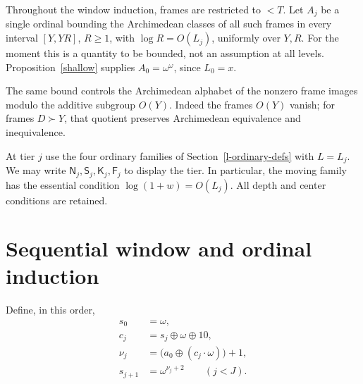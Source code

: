 \documentclass[11pt]{article}
\theoremstyle{definition}
\theoremstyle{remark}
\newcommand{\hs}{\mathbin{\oplus}}
\newcommand{\NN}{\mathsf N}
\newcommand{\SSS}{\mathsf S}
\newcommand{\KK}{\mathsf K}
\newcommand{\FF}{\mathsf F}
\numberwithin{equation}{section}
\begin{document}
Throughout the window induction, frames are restricted to $<T$.
Let \(A_j\) be a single ordinal bounding the Archimedean classes
of all such frames in every interval \([Y,YR]\), \(R\ge1\), with
\(\log R=O(L_j)\), uniformly over \(Y,R\). For the moment this
is a quantity to be bounded, not an assumption at all levels.
Proposition~\ref{shallow} supplies \(A_0=\omega^\omega\), since
\(L_0=x\).

The same bound controls the Archimedean alphabet of the nonzero
frame images modulo the additive subgroup \(O(Y)\). Indeed the
frames \(O(Y)\) vanish; for frames \(D\succ Y\), that quotient
preserves Archimedean equivalence and inequivalence.


At tier $j$ use the four ordinary families of
Section~\ref{l-ordinary-defs} with $L=L_j$. We may write
$\NN_j,\SSS_j,\KK_j,\FF_j$ to display the tier. In particular,
the moving family has the essential condition
$\log(1+w)=O(L_j)$. All depth and center conditions are retained.


\section{Sequential window and ordinal induction}

Define, in this order,
\begin{equation}
 \begin{aligned}
 s_0&=\omega,\\
 c_j&=s_j\hs\omega\hs10,\\
 \nu_j&=\bigl(a_0\hs(c_j\cdot\omega)\bigr)+1,\\
 s_{j+1}&=\omega^{\nu_j+2}\qquad(j<J).
 \end{aligned}
 \label{h-eq-5.1}
\end{equation}
\end{document}
